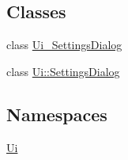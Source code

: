 \subsection*{Classes}
\begin{DoxyCompactItemize}
\item 
class \hyperlink{a00082}{Ui\+\_\+\+Settings\+Dialog}
\item 
class \hyperlink{a00076}{Ui\+::\+Settings\+Dialog}
\end{DoxyCompactItemize}
\subsection*{Namespaces}
\begin{DoxyCompactItemize}
\item 
 \hyperlink{a00145}{Ui}
\end{DoxyCompactItemize}
